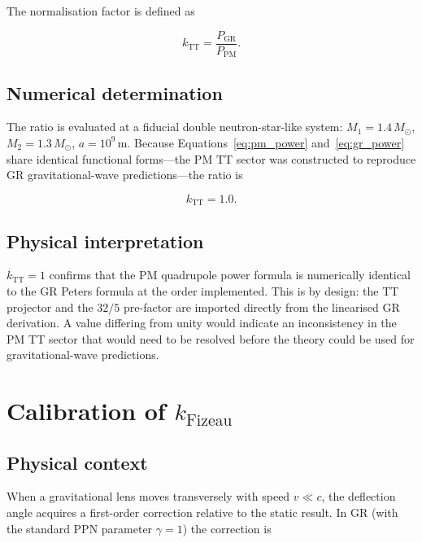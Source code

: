 \documentclass{article}
\begin{document}
The normalisation factor is defined as

\begin{equation}
  k_{\mathrm{TT}} = \frac{P_{\mathrm{GR}}}{P_{\mathrm{PM}}}.
  \label{eq:kTT_def}
\end{equation}

\subsection{Numerical determination}

The ratio is evaluated at a fiducial double neutron-star-like system:
$M_1 = 1.4\,M_\odot$, $M_2 = 1.3\,M_\odot$, $a = 10^9$\,m.
Because Equations~\eqref{eq:pm_power} and~\eqref{eq:gr_power} share identical
functional forms—the PM TT sector was constructed to reproduce GR
gravitational-wave predictions—the ratio is

\begin{equation}
  k_{\mathrm{TT}} = 1.0.
  \label{eq:kTT_result}
\end{equation}

\subsection{Physical interpretation}

$k_{\mathrm{TT}} = 1$ confirms that the PM quadrupole power formula is
numerically identical to the GR Peters formula at the order implemented.
This is by design: the TT projector and the $32/5$ pre-factor are imported
directly from the linearised GR derivation.  A value differing from unity
would indicate an inconsistency in the PM TT sector that would need to be
resolved before the theory could be used for gravitational-wave predictions.

\section{Calibration of $k_{\mathrm{Fizeau}}$}
\label{sec:kFizeau}

\subsection{Physical context}

When a gravitational lens moves transversely with speed $v \ll c$, the
deflection angle acquires a first-order correction relative to the static
result.  In GR (with the standard PPN parameter $\gamma = 1$) the
correction is
\end{document}
